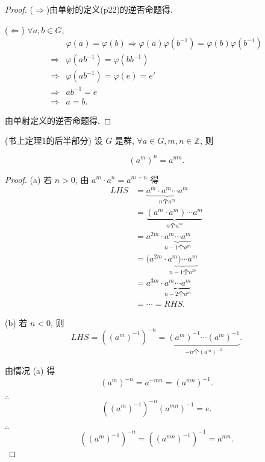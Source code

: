 \documentclass[color=black,device=normal,lang=cn,mode=geye]{elegantnote}
\begin{document}
\begin{proof}
    ($\Rightarrow$)由单射的定义(p22)的逆否命题得.

    ($\Leftarrow$) $\forall a,b\in G$,
    \begin{align*}
        & \varphi(a)=\varphi(b)\Rightarrow\varphi(a)\varphi(b^{-1})=\varphi(b)\varphi(b^{-1}) \\
        \Rightarrow & \varphi(ab^{-1})=\varphi(bb^{-1}) \\
        \Rightarrow & \varphi(ab^{-1})=\varphi(e)=e' \\
        \Rightarrow & ab^{-1}=e \\
        \Rightarrow & a=b.
    \end{align*}

    由单射定义的逆否命题得.
\end{proof}
\begin{theorem}(书上定理1的后半部分)
    设 $G$ 是群, $\forall a\in G,m,n\in\mathbb{Z}$, 则

    \[(a^m)^n=a^{mn}.\]
\end{theorem}
\begin{proof}
(a) 若 $n>0$, 由 $a^m\cdot a^n=a^{m+n}$ 得
\begin{align*}
    LHS & =\underbrace{a^m\cdot a^m\cdots a^m}_{n\text{个}a^m} \\
    & =\underbrace{(a^m\cdot a^m)\cdots a^m}_{n\text{个}a^m} \\
    & =a^{2m}\cdot\underbrace{a^m\cdots a^m}_{n-1\text{个}a^m} \\
    & =(a^{2m}\cdot\underbrace{a^m)\cdots a^m}_{n-1\text{个}a^m} \\
    & =a^{3m}\cdot\underbrace{a^m\cdots a^m}_{n-2\text{个}a^m} \\
    & =\cdots=RHS.
\end{align*}

(b) 若 $n<0$, 则
\[LHS=((a^m)^{-1})^{-n}=\underbrace{(a^m)^{-1}\cdots(a^m)^{-1}}_{-n\text{个}(a^m)^{-1}}.\]

由情况 (a) 得
\[(a^m)^{-n}=a^{-mn}=(a^{mn})^{-1}.\]

$\therefore$
\[((a^m)^{-1})^{-n}(a^{mn})^{-1}=e.\]

$\therefore$
\[((a^m)^{-1})^{-n}=((a^{mn})^{-1})^{-1}=a^{mn}.\]
\end{proof}
\end{document}
